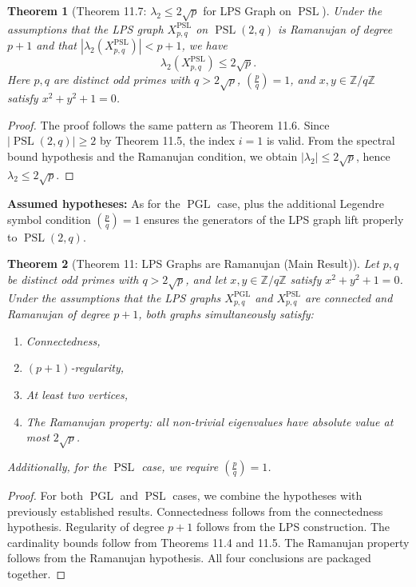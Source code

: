 \documentclass[11pt]{article}
\theoremstyle{plain}
\newtheorem*{theorem}{Theorem}
\theoremstyle{definition}
\theoremstyle{remark}
\begin{document}
\begin{theorem}[Theorem 11.7: $\lambda_2 \leq 2\sqrt{p}$ for LPS Graph on $\operatorname{PSL}$]
Under the assumptions that the LPS graph $X_{p,q}^{\operatorname{PSL}}$ on $\operatorname{PSL}(2,q)$ is Ramanujan of degree $p+1$ and that $|\lambda_2(X_{p,q}^{\operatorname{PSL}})| < p+1$, we have
\[
\lambda_2(X_{p,q}^{\operatorname{PSL}}) \leq 2\sqrt{p}.
\]
Here $p, q$ are distinct odd primes with $q > 2\sqrt{p}$, $\left(\frac{p}{q}\right) = 1$, and $x, y \in \mathbb{Z}/q\mathbb{Z}$ satisfy $x^2 + y^2 + 1 = 0$.
\end{theorem}

\begin{proof}
The proof follows the same pattern as Theorem 11.6. Since $|\operatorname{PSL}(2,q)| \geq 2$ by Theorem 11.5, the index $i = 1$ is valid. From the spectral bound hypothesis and the Ramanujan condition, we obtain $|\lambda_2| \leq 2\sqrt{p}$, hence $\lambda_2 \leq 2\sqrt{p}$.
\end{proof}

\textbf{Assumed hypotheses:} As for the $\operatorname{PGL}$ case, plus the additional Legendre symbol condition $\left(\frac{p}{q}\right) = 1$ ensures the generators of the LPS graph lift properly to $\operatorname{PSL}(2,q)$.

\begin{theorem}[Theorem 11: LPS Graphs are Ramanujan (Main Result)]
Let $p, q$ be distinct odd primes with $q > 2\sqrt{p}$, and let $x, y \in \mathbb{Z}/q\mathbb{Z}$ satisfy $x^2 + y^2 + 1 = 0$. Under the assumptions that the LPS graphs $X_{p,q}^{\operatorname{PGL}}$ and $X_{p,q}^{\operatorname{PSL}}$ are connected and Ramanujan of degree $p+1$, both graphs simultaneously satisfy:
\begin{enumerate}
\item Connectedness,
\item $(p+1)$-regularity, 
\item At least two vertices,
\item The Ramanujan property: all non-trivial eigenvalues have absolute value at most $2\sqrt{p}$.
\end{enumerate}
Additionally, for the $\operatorname{PSL}$ case, we require $\left(\frac{p}{q}\right) = 1$.
\end{theorem}

\begin{proof}
For both $\operatorname{PGL}$ and $\operatorname{PSL}$ cases, we combine the hypotheses with previously established results. Connectedness follows from the connectedness hypothesis. Regularity of degree $p+1$ follows from the LPS construction. The cardinality bounds follow from Theorems 11.4 and 11.5. The Ramanujan property follows from the Ramanujan hypothesis. All four conclusions are packaged together.
\end{proof}
\end{document}
